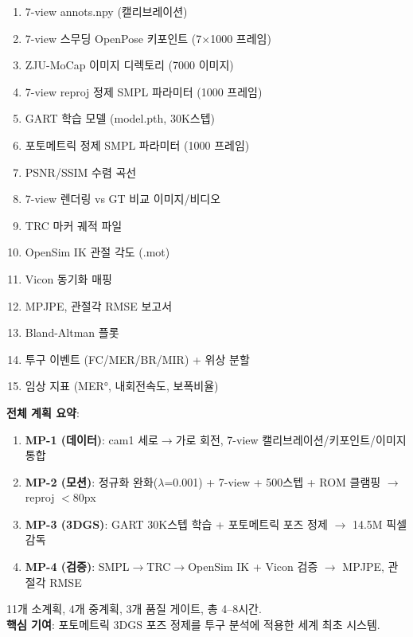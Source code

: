 \documentclass[11pt, a4paper]{report}
\begin{document}
\begin{checklistbox}[title={최종 산출물}]
\begin{enumerate}
\item[$\square$] 7-view annots.npy (캘리브레이션)
\item[$\square$] 7-view 스무딩 OpenPose 키포인트 (7$\times$1000 프레임)
\item[$\square$] ZJU-MoCap 이미지 디렉토리 (7000 이미지)
\item[$\square$] 7-view reproj 정제 SMPL 파라미터 (1000 프레임)
\item[$\square$] GART 학습 모델 (model.pth, 30K스텝)
\item[$\square$] 포토메트릭 정제 SMPL 파라미터 (1000 프레임)
\item[$\square$] PSNR/SSIM 수렴 곡선
\item[$\square$] 7-view 렌더링 vs GT 비교 이미지/비디오
\item[$\square$] TRC 마커 궤적 파일
\item[$\square$] OpenSim IK 관절 각도 (.mot)
\item[$\square$] Vicon 동기화 매핑
\item[$\square$] MPJPE, 관절각 RMSE 보고서
\item[$\square$] Bland-Altman 플롯
\item[$\square$] 투구 이벤트 (FC/MER/BR/MIR) + 위상 분할
\item[$\square$] 임상 지표 (MER°, 내회전속도, 보폭비율)
\end{enumerate}
\end{checklistbox}


\begin{summary}
\textbf{전체 계획 요약}:
\begin{enumerate}
\item \textbf{MP-1 (데이터)}: cam1 세로$\to$가로 회전, 7-view 캘리브레이션/키포인트/이미지 통합
\item \textbf{MP-2 (모션)}: 정규화 완화($\lambda$=0.001) + 7-view + 500스텝 + ROM 클램핑 $\to$ reproj $<$80px
\item \textbf{MP-3 (3DGS)}: GART 30K스텝 학습 + 포토메트릭 포즈 정제 $\to$ 14.5M 픽셀 감독
\item \textbf{MP-4 (검증)}: SMPL$\to$TRC$\to$OpenSim IK + Vicon 검증 $\to$ MPJPE, 관절각 RMSE
\end{enumerate}
11개 소계획, 4개 중계획, 3개 품질 게이트, 총 4--8시간.\\
\textbf{핵심 기여}: 포토메트릭 3DGS 포즈 정제를 투구 분석에 적용한 세계 최초 시스템.
\end{summary}
\end{document}
